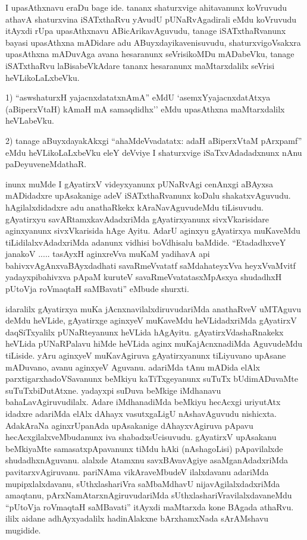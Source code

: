 \begin{artha}
I upasAthxnavu eraDu bage ide. tananx shaturxvige ahitavanunx koVruvudu athavA shaturxvina iSATxthaRvu yAvudU pUNaRvAgadirali eMdu koVruvudu itAyxdi rUpa upasAthxnavu ABicArikavAguvudu, tanage iSATxthaRvanunx bayasi upasAthxna mADidare adu ABuyxdayikavenisuvudu, shaturxvigoVsakxra upasAthxna mADuvAga avana hesaranunx seVrisikoMDu mADabeVku, tanage iSATxthaRvu laBisabeVkAdare tananx hesaranunx maMtarxdalilx seVrisi heVLikoLaLxbeVku.

1) ``aswshaturxH yajacnxdatatxnAmA'' eMdU `asemxYyajacnxdatAtxya (aBiperxVtaH) kAmaH mA samaqdidhx'' eMdu upasAthxna maMtarxdalilx heVLabeVku.

2) tanage aBuyxdayakAkxgi ``ahaMdeVvadatatx: adaH aBiperxVtaM pArxpamf'' eMdu heVLikoLaLxbeVku eleY deVviye I shaturxvige iSaTxvAdadadxnunx nAnu paDeyuveneMdathaR.
\end{artha}

\begin{artha}
inunx muMde I gAyatirxV videyxyanunx pUNaRvAgi cenAnxgi aBAyxsa mADidadxre upAsakanige adeV iSATxthaRvanunx koDalu shakatxvAguvudu. hAgilalxdidadxre adu anathaRkekx kAraNavAguvudeMdu tiLisuvudu. gAyatirxyu savARtamxkavAdadxriMda gAyatirxyanunx sivxVkarisidare aginxyanunx sivxVkarisida hAge Ayitu. AdarU aginxyu gAyatirxya muKaveMdu tiLidilalxvAdadxriMda adanunx vidhisi boVdhisalu baMdide. ``EtadadhxveY janakoV ..... tasAyxH aginxreVva muKaM yadihavA api bahivxvAgAnxvaBAyxdadhati savaRmeVvatatf saMdahateyxVva heyxVvaMvitf yadayxpibahivxva pApaM kuruteV savaRmeVvatatasxMpAsxya shudadhxH pUtoV\s ja roV\s maqtaH saMBavati'' eMbude shurxti. 

idaralilx gAyatirxya muKa jAcnxnavilalxdiruvudariMda anathaRveV uMTAguvu deMdu heVLide, gAyatirxge aginxyeV muKaveMdu heVLidadxriMda gAyatirxV daqSiTxyalilx pUNaRteyanunx heVLida hAgAyitu. gAyatirxVdashaRnakekx heVLida pUNaRPalavu hiMde heVLida aginx muKajAcnxnadiMda AguvudeMdu tiLiside. yAru aginxyeV muKavAgiruva gAyatirxyanunx tiLiyuvano upAsane mADuvano, avanu aginxyeV Aguvanu. adariMda tAnu mADida elAlx parxtigarxhadoVSavanunx beMkiyu kaTiTxgeyanunx suTuTx bUdimADuvaMte suTuTxbiDutAtxne. yadayxpi suDuva beMkige iMdhanavu  bahaLavAgiruvudilalx. Adare iMdhanadiMda beMkiyu hecAcxgi uriyutAtx idadxre adariMda elAlx dAhayx vasutxgaLigU nAshavAguvudu nishicxta. AdakAraNa aginxrUpanAda upAsakanige dAhayxvAgiruva pApavu hecAcxgilalxveMbudanunx iva shabadxsUcisuvudu. gAyatirxV upAsakanu beMkiyaMte samasatxpApavanunx tiMdu hAki (nAshagoLisi) pApavilalxde shudadhxnAguvanu. alalxde Atamxnu savxBAvavAgiye asaMganAdadxriMda pavitarxvAgiruvanu. pariNAma vikAraveMbudeV ilalxdavanu adariMda mupipxlalxdavanu, sUthxlashariVra saMbaMdhavU nijavAgilalxdadxriMda amaqtanu, pArxNamAtarxnAgiruvudariMda sUthxlashariVravilalxdavaneMdu ``pUtoV\s ja roV\s maqtaH saMBavati'' itAyxdi maMtarxda kone BAgada athaRvu. ililx aidane adhAyxyadalilx hadinAlakxne bArxhamxNada sArAMshavu mugidide.
\end{artha}

